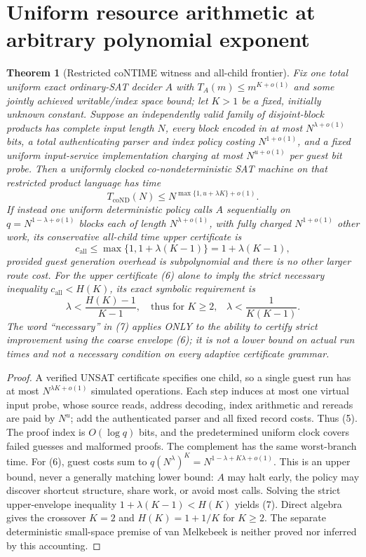 \documentclass[11pt]{article}
\newtheorem{theorem}{Theorem}
\begin{document}
\section{Uniform resource arithmetic at arbitrary polynomial exponent}
\begin{theorem}[Restricted coNTIME witness and all-child frontier]\label{th:k}
Fix one total uniform exact ordinary-SAT decider $A$ with $T_A(m)\le m^{K+o(1)}$ and some jointly achieved writable/index space bound; let $K>1$ be a fixed, initially unknown constant. Suppose an independently valid family of disjoint-block products has complete input length $N$, every block encoded in at most $N^{\lambda+o(1)}$ bits, a total authenticating parser and index policy costing $N^{1+o(1)}$, and a fixed uniform input-service implementation charging at most $N^{u+o(1)}$ per guest bit probe. Then a uniformly clocked co-nondeterministic SAT machine on that \emph{restricted product language} has time
\[
T_{\mathrm{coND}}(N)\le N^{\max\{1,u+\lambda K\}+o(1)}.\tag{5}
\]
If instead one uniform deterministic policy calls $A$ sequentially on $q=N^{1-\lambda+o(1)}$ blocks each of length $N^{\lambda+o(1)}$, with fully charged $N^{1+o(1)}$ other work, its conservative all-child time \emph{upper certificate} is
\[
c_{\mathrm{all}}\le\max\{1,1+\lambda(K-1)\}=1+\lambda(K-1),\tag{6}
\]
provided guest generation overhead is subpolynomial and there is no other larger route cost. For the upper certificate (6) alone to imply the strict necessary inequality $c_{\mathrm{all}}<H(K)$, its exact symbolic requirement is
\[
\boxed{\lambda<\frac{H(K)-1}{K-1},\quad\text{thus for $K\ge2$,}\quad
\lambda<\frac1{K(K-1)}.}\tag{7}
\]
The word ``necessary'' in (7) applies ONLY to the ability to certify strict improvement using the coarse envelope (6); it is not a lower bound on actual run times and not a necessary condition on every adaptive certificate grammar.
\end{theorem}
\begin{proof}
A verified UNSAT certificate specifies one child, so a single guest run has at most $N^{\lambda K+o(1)}$ simulated operations. Each step induces at most one virtual input probe, whose source reads, address decoding, index arithmetic and rereads are paid by $N^u$; add the authenticated parser and all fixed record costs. Thus (5). The proof index is $O(\log q)$ bits, and the predetermined uniform clock covers failed guesses and malformed proofs. The complement has the same worst-branch time.
For (6), guest costs sum to $q(N^\lambda)^K=N^{1-\lambda+K\lambda+o(1)}$. This is an upper bound, never a generally matching lower bound: $A$ may halt early, the policy may discover shortcut structure, share work, or avoid most calls. Solving the strict upper-envelope inequality $1+\lambda(K-1)<H(K)$ yields (7). Direct algebra gives the crossover $K=2$ and $H(K)=1+1/K$ for $K\ge2$. The separate deterministic small-space premise of van Melkebeek is neither proved nor inferred by this accounting.
\end{proof}
\end{document}
